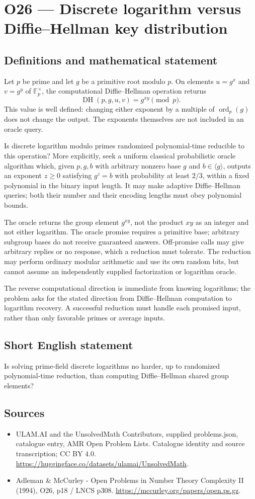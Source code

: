 \documentclass[11pt,a4paper]{article}
\begin{document}
\section*{O26 — Discrete logarithm versus Diffie–Hellman key distribution}\label{statement}

\subsection{Definitions and mathematical statement}
Let $p$ be prime and let $g$ be a primitive root modulo $p$. On elements $u=g^x$ and $v=g^y$ of $\mathbb F_p^\times$, the computational Diffie--Hellman operation returns
\[
\operatorname{DH}(p,g,u,v)=g^{xy}\pmod p.
\]
This value is well defined: changing either exponent by a multiple of $\operatorname{ord}_p(g)$ does not change the output. The exponents themselves are not included in an oracle query.

Is discrete logarithm modulo primes randomized polynomial-time reducible to this operation? More explicitly, seek a uniform classical probabilistic oracle algorithm which, given $p,g,b$ with arbitrary nonzero base $g$ and $b\in\langle g\rangle$, outputs an exponent $z\ge0$ satisfying $g^z=b$ with probability at least $2/3$, within a fixed polynomial in the binary input length. It may make adaptive Diffie--Hellman queries; both their number and their encoding lengths must obey polynomial bounds.

The oracle returns the group element $g^{xy}$, not the product $xy$ as an integer and not either logarithm. The oracle promise requires a primitive base; arbitrary subgroup bases do not receive guaranteed answers. Off-promise calls may give arbitrary replies or no response, which a reduction must tolerate. The reduction may perform ordinary modular arithmetic and use its own random bits, but cannot assume an independently supplied factorization or logarithm oracle.

The reverse computational direction is immediate from knowing logarithms; the problem asks for the stated direction from Diffie--Hellman computation to logarithm recovery. A successful reduction must handle each promised input, rather than only favorable primes or average inputs.
\subsection{Short English statement}
Is solving prime-field discrete logarithms no harder, up to randomized polynomial-time reduction, than computing Diffie–Hellman shared group elements?
\subsection{Sources}
\begin{itemize}
\item[S1] ULAM.AI and the UnsolvedMath Contributors, supplied problems.json, catalogue entry, AMR Open Problem Lists. Catalogue identity and source transcription; CC BY 4.0.
\url{https://huggingface.co/datasets/ulamai/UnsolvedMath}.
\item[S2] Adleman \& McCurley - Open Problems in Number Theory Complexity II (1994), O26, p18 / LNCS p308. 
\url{https://mccurley.org/papers/open.ps.gz}.
\end{itemize}
\end{document}
